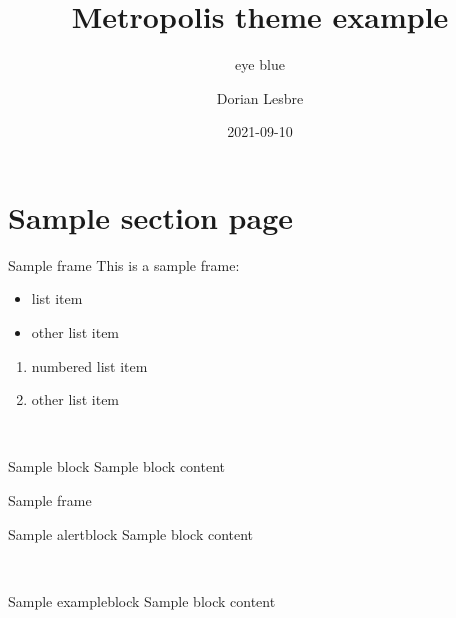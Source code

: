 \documentclass[14pt]{beamer}
\title{Metropolis theme example}
\subtitle{eye blue}
\author{Dorian Lesbre}
\date{2021-09-10}
\begin{document}
\begin{frame}
	\titlepage
\end{frame}

\section{Sample section page}

\begin{frame}{Sample frame}
	This is a sample frame:
	\begin{multicols}{2}
		\begin{itemize}
			\item list item
			\item other list item
		\end{itemize}
		\begin{enumerate}
			\item numbered list item
			\item other list item
		\end{enumerate}
	\end{multicols}
	~\\
	\begin{block}{Sample block}
		Sample block content
	\end{block}
\end{frame}

\begin{frame}{Sample frame}

	\begin{alertblock}{Sample alertblock}
		Sample block content
	\end{alertblock}
	~\\
	\begin{exampleblock}{Sample exampleblock}
		Sample block content
	\end{exampleblock}
\end{frame}
\end{document}
